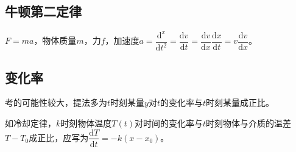 \documentclass[UTF8, 12pt]{ctexart}
\begin{document}
\subsection{牛顿第二定律}

$F=ma$，物体质量$m$，力$f$，加速度$a=\dfrac{\textrm{d}^x}{\textrm{d}t^2}=\dfrac{\textrm{d}v}{\textrm{d}t}=\dfrac{\textrm{d}v}{\textrm{d}x}\dfrac{\textrm{d}x}{\textrm{d}t}=v\dfrac{\textrm{d}v}{\textrm{d}x}$。

\subsection{变化率}

考的可能性较大，提法多为$t$时刻某量$y$对$t$的变化率与$t$时刻某量成正比。

如冷却定律，$k$时刻物体温度$T(t)$对时间的变化率与$t$时刻物体与介质的温差$T-T_0$成正比，应写为$\dfrac{\textrm{d}T}{\textrm{d}t}=-k(x-x_0)$。
\end{document}
